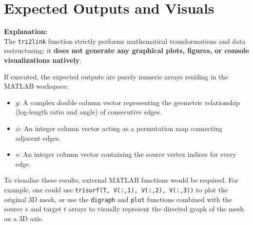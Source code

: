 \section{Expected Outputs and Visuals}

\textbf{Explanation:} \\
The \texttt{tri2link} function strictly performs mathematical transformations and data restructuring; it \textbf{does not generate any graphical plots, figures, or console visualizations natively}. 

If executed, the expected outputs are purely numeric arrays residing in the MATLAB workspace:
\begin{itemize}
    \item \textbf{$g$}: A complex double column vector representing the geometric relationship (log-length ratio and angle) of consecutive edges.
    \item \textbf{$\phi$}: An integer column vector acting as a permutation map connecting adjacent edges.
    \item \textbf{$s$}: An integer column vector containing the source vertex indices for every edge.
\end{itemize}

To visualize these results, external MATLAB functions would be required. For example, one could use \texttt{trisurf(T, V(:,1), V(:,2), V(:,3))} to plot the original 3D mesh, or use the \texttt{digraph} and \texttt{plot} functions combined with the source $s$ and target $t$ arrays to visually represent the directed graph of the mesh on a 3D axis.
